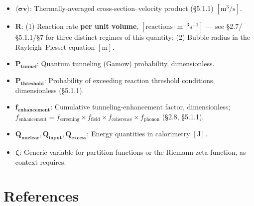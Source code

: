 \documentclass[11pt,a4paper]{article}
\begin{document}
\begin{itemize}
\item
  $\boldsymbol{\langle\sigma v\rangle}$: Thermally-averaged cross-section--velocity product (\S{}5.1.1) $[\text{m}^3/\text{s}]$.
\item
  $\boldsymbol{R}$: (1) Reaction rate \textbf{per unit volume}, $[\text{reactions}\cdot\text{m}^{-3}\text{s}^{-1}]$ --- see \S{}2.7/\S{}5.1.1/\S{}7 for three distinct regimes of this quantity; (2) Bubble radius in the Rayleigh--Plesset equation $[\text{m}]$.
\item
  $\boldsymbol{P_{\text{tunnel}}}$: Quantum tunneling (Gamow) probability, dimensionless.
\item
  $\boldsymbol{P_{\text{threshold}}}$: Probability of exceeding reaction threshold conditions, dimensionless (\S{}5.1.1).
\item
  $\boldsymbol{f_{\text{enhancement}}}$: Cumulative tunneling-enhancement factor, dimensionless; $f_{\text{enhancement}} = f_{\text{screening}} \times f_{\text{field}} \times f_{\text{coherence}} \times f_{\text{phonon}}$ (\S{}2.8, \S{}5.1.1).
\item
  $\boldsymbol{Q_{\text{nuclear}}, Q_{\text{input}}, Q_{\text{excess}}}$: Energy quantities in calorimetry $[\text{J}]$.
\item
  $\boldsymbol{\zeta}$: Generic variable for partition functions or the Riemann zeta function, as context requires.
\end{itemize}

\section*{References}


\end{document}
